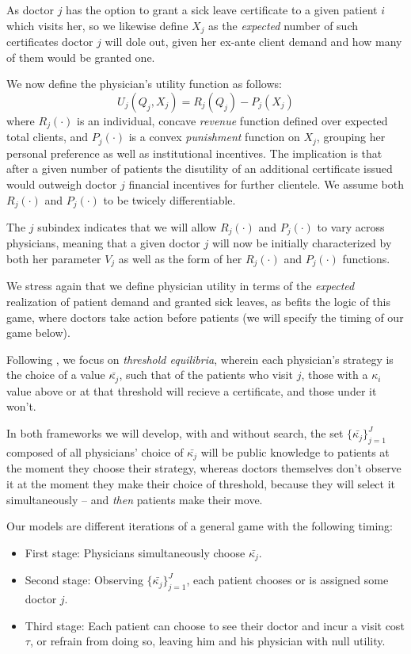 \documentclass[../main.tex]{subfiles}
\begin{document}
As doctor $j$ has the option to grant a sick leave certificate to a given patient $i$ which visits her, so we likewise define $X_j$ as the \textit{expected} number of such certificates doctor $j$ will dole out, given her ex-ante client demand and how many of them would be granted one.

We now define the physician's utility function as follows:
\[
U_j(Q_j, X_j) = R_j(Q_j) - P_j(X_j)
\]
where $R_j(\cdot)$ is an individual, concave \textit{revenue} function defined over expected total clients, and $P_j(\cdot)$ is a convex \textit{punishment} function on $X_j$, grouping her personal preference as well as institutional incentives. The implication is that after a given number of patients the disutility of an additional certificate issued would outweigh doctor $j$ financial incentives for further clientele. We assume both $R_j(\cdot)$ and $P_j(\cdot)$ to be twicely differentiable.

The $j$ subindex indicates that we will allow $R_j(\cdot)$ and $P_j(\cdot)$ to vary across physicians, meaning that a given doctor $j$ will now be initially characterized by both her parameter $V_j$ as well as the form of her $R_j(\cdot)$ and $P_j(\cdot)$ functions.

We stress again that we define physician utility in terms of the \textit{expected} realization of patient demand and granted sick leaves, as befits the logic of this game, where doctors take action before patients (we will specify the timing of our game below).

Following \cite{schnell2017physician}, we focus on \textit{threshold equilibria}, wherein each physician's strategy is the choice of a value $\bar{\kappa_j}$, such that of the patients who visit $j$, those with a $\kappa_i$ value above or at that threshold will recieve a certificate, and those under it won't.

In both frameworks we will develop, with and without search, the set $\{\bar{\kappa_j}\}_{j =1}^{J}$ composed of all physicians' choice of $\bar{\kappa_j}$ will be public knowledge to patients at the moment they choose their strategy, whereas doctors themselves don't observe it at the moment they make their choice of threshold, because they will select it simultaneously -- and \textit{then} patients make their move.

Our models are different iterations of a general game with the following timing:
\begin{itemize}
    \item First stage: Physicians simultaneously choose $\bar{\kappa_j}$.
    \item Second stage: Observing $\{\bar{\kappa_j}\}_{j =1}^{J}$, each patient chooses or is assigned some doctor $j$.
    \item Third stage: Each patient can choose to see their doctor and incur a visit cost $\tau$, or refrain from doing so, leaving him and his physician with null utility.
\end{itemize}
\end{document}
